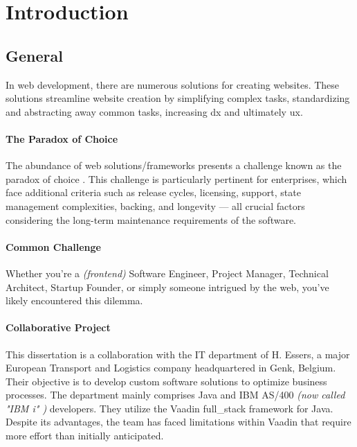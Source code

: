 \chapter{Introduction}

\section{General}
In web development, there are numerous solutions for creating websites. These solutions streamline website creation by simplifying complex tasks, standardizing and abstracting away common tasks, increasing \acrshort{dx} and ultimately \acrshort{ux}.

\subsubsection{The Paradox of Choice}
The abundance of web solutions/frameworks presents a challenge known as the paradox of choice \cite{the_decision_lab:paradox_of_choice}. This challenge is particularly pertinent for enterprises, which face additional criteria such as release cycles, licensing, support, state management complexities, backing, and longevity — all crucial factors considering the long-term maintenance requirements of the software.

\subsubsection{Common Challenge}

Whether you're a \textit{(frontend)} Software Engineer, Project Manager, Technical Architect, Startup Founder, or simply someone intrigued by the web, you've likely encountered this dilemma.

\subsubsection{Collaborative Project}

This dissertation is a collaboration with the IT department of H. Essers, a major European Transport and Logistics company headquartered in Genk, Belgium. Their objective is to develop custom software solutions to optimize business processes. The department mainly comprises Java and IBM AS/400 \textit{(now called "IBM i" \cite{enwiki:ibm_i})} developers. They utilize the Vaadin \gls{full_stack} framework for Java. Despite its advantages, the team has faced limitations within Vaadin that require more effort than initially anticipated.

